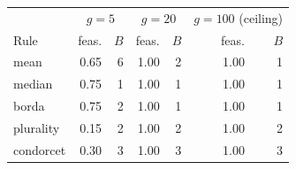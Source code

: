 \begin{tabular}{@{}lrrrrrr@{}}\toprule
 & \multicolumn{2}{c}{$g=5$} & \multicolumn{2}{c}{$g=20$} & \multicolumn{2}{c}{$g=100$ (ceiling)}\\
 Rule & feas. & $B$ & feas. & $B$ & feas. & $B$\\\midrule
mean & 0.65 & 6 & 1.00 & 2 & 1.00 & 1\\
median & 0.75 & 1 & 1.00 & 1 & 1.00 & 1\\
borda & 0.75 & 2 & 1.00 & 1 & 1.00 & 1\\
plurality & 0.15 & 2 & 1.00 & 2 & 1.00 & 2\\
condorcet & 0.30 & 3 & 1.00 & 3 & 1.00 & 3\\
\bottomrule\end{tabular}
